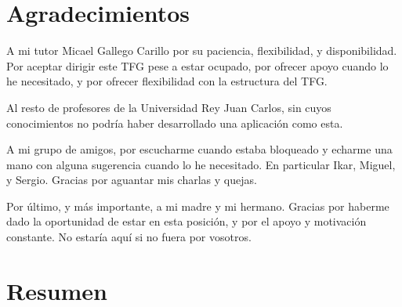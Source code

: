 \documentclass[12pt,twoside,titlepage]{report}
\begin{document}
\pagestyle{plain}





\setlength{\parskip}{0.75em}
\renewcommand{\baselinestretch}{1.25}

\setcounter{page}{2}





\chapter*{Agradecimientos}

A mi tutor Micael Gallego Carillo por su paciencia, flexibilidad, y disponibilidad. Por aceptar dirigir este TFG pese a estar ocupado, por ofrecer apoyo cuando lo he necesitado, y por ofrecer flexibilidad con la estructura del TFG.

Al resto de profesores de la Universidad Rey Juan Carlos, sin cuyos conocimientos no podría haber desarrollado una aplicación como esta.

A mi grupo de amigos, por escucharme cuando estaba bloqueado y echarme una mano con alguna sugerencia cuando lo he necesitado. En particular Ikar, Miguel, y Sergio. Gracias por aguantar mis charlas  y quejas.

Por último, y más importante, a mi madre y mi hermano. Gracias por haberme dado la oportunidad de estar en esta posición, y por el apoyo y motivación constante. No estaría aquí si no fuera por vosotros.

\afterpage{\blankpage}




\chapter*{Resumen}
\end{document}
